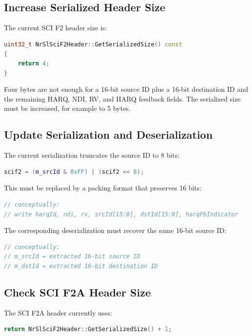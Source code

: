 \documentclass[11pt]{article}
\begin{document}
\subsection{Increase Serialized Header Size}

The current SCI F2 header size is:

\begin{lstlisting}[language=C++]
uint32_t NrSlSciF2Header::GetSerializedSize() const
{
    return 4;
}
\end{lstlisting}

Four bytes are not enough for a 16-bit source ID plus a 16-bit destination ID and the remaining HARQ, NDI, RV, and HARQ feedback fields. The serialized size must be increased, for example to 5 bytes.

\subsection{Update Serialization and Deserialization}

The current serialization truncates the source ID to 8 bits:

\begin{lstlisting}[language=C++]
scif2 = (m_srcId & 0xFF) | (scif2 << 8);
\end{lstlisting}

This must be replaced by a packing format that preserves 16 bits:

\begin{lstlisting}[language=C++]
// conceptually:
// write harqId, ndi, rv, srcId[15:0], dstId[15:0], harqFbIndicator
\end{lstlisting}

The corresponding deserialization must recover the same 16-bit source ID:

\begin{lstlisting}[language=C++]
// conceptually:
// m_srcId = extracted 16-bit source ID
// m_dstId = extracted 16-bit destination ID
\end{lstlisting}

\subsection{Check SCI F2A Header Size}

The SCI F2A header currently uses:

\begin{lstlisting}[language=C++]
return NrSlSciF2Header::GetSerializedSize() + 1;
\end{lstlisting}
\end{document}

